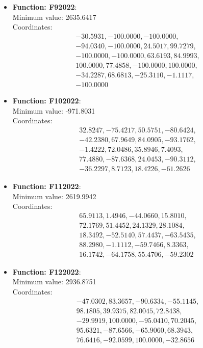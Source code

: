 \documentclass{article}
\begin{document}
\begin{itemize}
  \item \textbf{Function: F92022}: \\
    Minimum value: 2635.6417 \\
    Coordinates:
    \[
      \begin{aligned}
        & -30.5931, -100.0000, -100.0000, \\
        & -94.0340, -100.0000, 24.5017, 99.7279, \\
        & -100.0000, -100.0000, 63.6193, 84.9993, \\
        & 100.0000, 77.4858, -100.0000, 100.0000, \\
        & -34.2287, 68.6813, -25.3110, -1.1117, \\
        & -100.0000
      \end{aligned}
    \]

  \item \textbf{Function: F102022}: \\
    Minimum value: -971.8031 \\
    Coordinates:
    \[
      \begin{aligned}
        & 32.8247, -75.4217, 50.5751, -80.6424, \\
        & -42.2380, 67.9649, 84.0905, -93.1762, \\
        & -1.4222, 72.0486, 35.8946, 7.4093, \\
        & 77.4880, -87.6368, 24.0453, -90.3112, \\
        & -36.2297, 8.7123, 18.4226, -61.2626
      \end{aligned}
    \]

  \item \textbf{Function: F112022}: \\
    Minimum value: 2619.9942 \\
    Coordinates:
    \[
      \begin{aligned}
        & 65.9113, 1.4946, -44.0660, 15.8010, \\
        & 72.1769, 51.4452, 24.1329, 28.1084, \\
        & 18.3492, -52.5140, 57.4437, -63.5435, \\
        & 88.2980, -1.1112, -59.7466, 8.3363, \\
        & 16.1742, -64.1758, 55.4706, -59.2302
      \end{aligned}
    \]

  \item \textbf{Function: F122022}: \\
    Minimum value: 2936.8751 \\
    Coordinates:
    \[
      \begin{aligned}
        & -47.0302, 83.3657, -90.6334, -55.1145, \\
        & 98.1805, 39.9375, 82.0045, 72.8438, \\
        & -29.9919, 100.0000, -95.0410, 70.2045, \\
        & 95.6321, -87.6566, -65.9060, 68.3943, \\
        & 76.6416, -92.0599, 100.0000, -32.8656
      \end{aligned}
    \]

\end{itemize}
\end{document}
